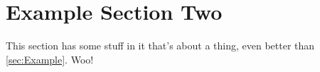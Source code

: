 
\section{Example Section Two}\label{sec:ExampleTwo}

This section has some stuff in it that's about a thing, even better than \autoref{sec:Example}. Woo!
